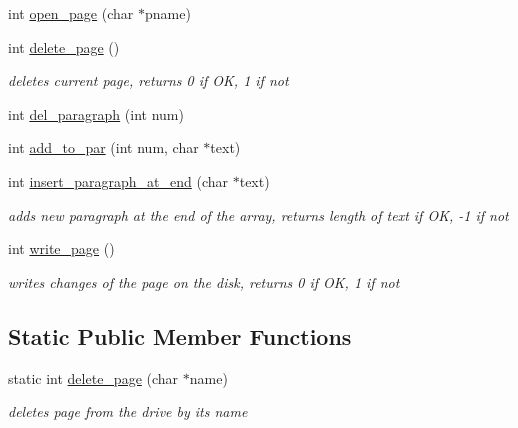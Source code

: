 \begin{DoxyCompactItemize}
int \hyperlink{classpage_a5eae57fad910ef40d723c1808eeabad9}{open\+\_\+page} (char $\ast$pname)
\item 
\mbox{\label{classpage_ad3851ad84faf2677e8a50087e0627509}} 
int \hyperlink{classpage_ad3851ad84faf2677e8a50087e0627509}{delete\+\_\+page} ()
\begin{DoxyCompactList}\small\item\em deletes current page, returns 0 if OK, 1 if not \end{DoxyCompactList}\item 
int \hyperlink{classpage_a1c55a90abfcc823c8216c9dad7660f24}{del\+\_\+paragraph} (int num)
\item 
int \hyperlink{classpage_a03e597adceb2d5147a1729d6517df5b4}{add\+\_\+to\+\_\+par} (int num, char $\ast$text)
\item 
\mbox{\label{classpage_a5182baae92ba16e0d8ac1c1b97cda5c0}} 
int \hyperlink{classpage_a5182baae92ba16e0d8ac1c1b97cda5c0}{insert\+\_\+paragraph\+\_\+at\+\_\+end} (char $\ast$text)
\begin{DoxyCompactList}\small\item\em adds new paragraph at the end of the array, returns length of text if OK, -\/1 if not \end{DoxyCompactList}\item 
\mbox{\label{classpage_a5cbc74c74b3b2296bc76fe5496cff59f}} 
int \hyperlink{classpage_a5cbc74c74b3b2296bc76fe5496cff59f}{write\+\_\+page} ()
\begin{DoxyCompactList}\small\item\em writes changes of the page on the disk, returns 0 if OK, 1 if not \end{DoxyCompactList}\end{DoxyCompactItemize}
\subsection*{Static Public Member Functions}
\begin{DoxyCompactItemize}
\item 
\mbox{\label{classpage_a4030e9084e093da1687ed0a0ff34c9d2}} 
static int \hyperlink{classpage_a4030e9084e093da1687ed0a0ff34c9d2}{delete\+\_\+page} (char $\ast$name)
\begin{DoxyCompactList}\small\item\em deletes page from the drive by its name \end{DoxyCompactList}\end{DoxyCompactItemize}
